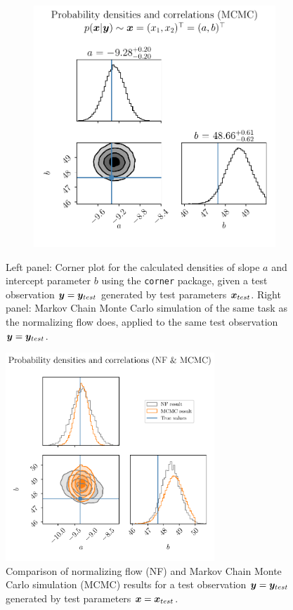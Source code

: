 \documentclass[a4paper,11pt]{report}
\begin{document}
\begin{figure}[h!]
\begin{subfigure}[t]{0.49\textwidth}
		\includegraphics[width=\textwidth]{figures/nf-linear-regression-example-corner-mcmc.pdf}
	\end{subfigure}
	\cprotect\caption{Left panel: Corner plot for the calculated densities of slope $a$ and intercept parameter $b$ using the \verb|corner| package, given a test observation $\bm{y} = \bm{y}_{test}$ generated by test parameters $\bm{x}_{test}$. Right panel: Markov Chain Monte Carlo simulation of the same task as the normalizing flow does, applied to the same test observation $\bm{y} = \bm{y}_{test}$.}
	\label{fig:linear-regression-results}
\end{figure}
\begin{figure}[h!]
	\centering
	\includegraphics[width=0.7\textwidth]{figures/nf-linear-regression-example-corner-mcmc-nf.pdf}
	\caption{Comparison of normalizing flow (NF) and Markov Chain Monte Carlo simulation (MCMC) results for a test observation $\bm{y} = \bm{y}_{test}$ generated by test parameters $\bm{x} = \bm{x}_{test}$.}
	\label{fig:nf-linear-regression-example-corner-mcmc-nf}
\end{figure}
\end{document}
